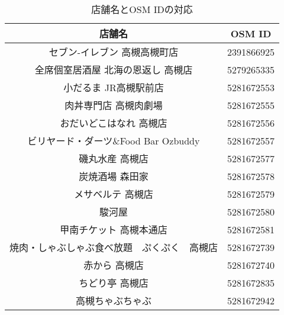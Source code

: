   \begin{table}[tb]
    \caption{店舗名とOSM IDの対応}
    \label{table:storename_to_osmid}
    \begin{center}
      \begin{tabular}{c|c}
        \hline\hline
        \textbf{店舗名} & \textbf{OSM ID} \\ 
        \hline
        セブン-イレブン 高槻高槻町店 & 2391866925 \\
        全席個室居酒屋 北海の恩返し 高槻店 & 5279265335 \\
        小だるま JR高槻駅前店 & 5281672553 \\
        肉丼専門店 高槻肉劇場 & 5281672555 \\
        おだいどこはなれ 高槻店 & 5281672556 \\
        ビリヤード・ダーツ\&Food Bar Ozbuddy & 5281672557 \\
        磯丸水産 高槻店 & 5281672577 \\
        炭焼酒場 森田家 & 5281672578 \\
        メサベルテ 高槻店 & 5281672579 \\
        駿河屋 & 5281672580 \\
        甲南チケット 高槻本通店 & 5281672581 \\
        焼肉・しゃぶしゃぶ食べ放題　ぷくぷく　高槻店 & 5281672739 \\
        赤から 高槻店 & 5281672740 \\
        ちどり亭 高槻店 & 5281672835 \\
        高槻ちゃぶちゃぶ & 5281672942 \\
        \hline
      \end{tabular}
    \end{center}


\end{table}
